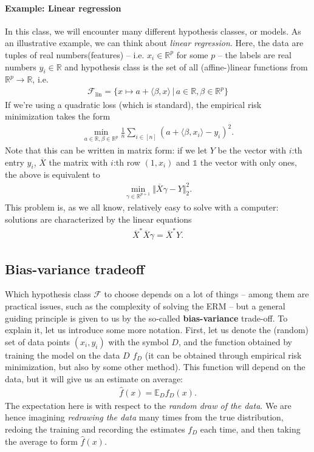 \documentclass{article}
\newcommand{\calF}{\mathcal{F}}
\newcommand{\sprod}[1]{\langle #1 \rangle}
\newcommand{\R}{\mathbb{R}}
\newcommand{\norm}[1]{\Vert #1 \Vert}
\newcommand{\one}{\mathds{1}}
\begin{document}
\paragraph{Example: Linear regression} In this class, we will encounter many different hypothesis classes, or models. As an illustrative example, we can think about \emph{linear regression}. Here, the data are tuples of real numbers(features) -- i.e. $x_i \in \R^p$ for some $p$ -- the labels are real numbers $y_i \in \R$ and hypothesis class is the set of all (affine-)linear functions from $\R^p \to \R$, i.e.
\begin{align*}
    \calF_{\mathrm{lin}} = \{x \mapsto a + \sprod{\beta, x} \, \vert \, a \in \R, \beta \in \R^p\}
\end{align*}
If we're using a quadratic loss (which is standard), the empirical risk minimization takes the form
\begin{align*}
    \min_{a\in \R, \beta \in \R^p} \tfrac{1}{n} \sum_{i \in [n]} (a + \sprod{\beta,x_i} - y_i)^2.
\end{align*}
Note that this can be written in matrix form: if we let $Y$ be the vector with $i$:th entry $y_i$, $\overline{X}$ the matrix with $i$:th row $(1,x_i)$ and $\one$ the vector with only ones, the above is equivalent to 
\begin{align*}
    \min_{\gamma \in \R^{p+1}} \norm{\overline{X}\gamma -Y}_2^2.
\end{align*}
This problem is, as we all know, relatively easy to solve with a computer: solutions are characterized by the linear equations
\begin{align*}
    \overline{X}^*\overline{X}\gamma = \overline{X}^*Y.
\end{align*}

\subsection{Bias-variance tradeoff}
Which hypothesis class $\calF$ to choose depends on a lot of things -- among them are practical issues, such as the complexity of solving the ERM -- but a general guiding principle is given to us by the so-called \textbf{bias-variance} trade-off. To explain it, let us introduce some more notation. First, let us denote the (random) set of data points $(x_i,y_i)$ with the symbol $D$, and the function obtained by training the model on the data $D$ $f_D$ (it can be obtained through empirical risk minimization, but also by some other method). This function will depend on the data, but it will give us an estimate on average:
\begin{align*}
    \widehat{f}(x) = \mathbb{E}_D f_D(x).
\end{align*}
The expectation here is with respect to the \emph{random draw of the data}. We are hence imagining \emph{redrawing the data} many times from the true distribution, redoing the training and recording the estimates $f_D$ each time, and then taking the average to form $\widehat{f}(x)$.
\end{document}
